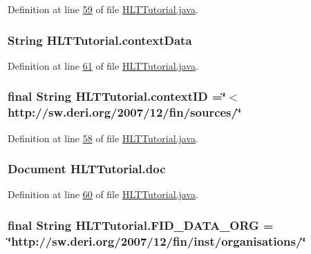 Definition at line \hyperlink{L59}{59} of file \hyperlink{}{H\-L\-T\-Tutorial.\-java}.

\hypertarget{class_h_l_t_tutorial_af324de58fa0893753bf1d449a959be55}{
\subsubsection[{context\-Data}]{\setlength{\rightskip}{0pt plus 5cm}String H\-L\-T\-Tutorial.\-context\-Data\hspace{0.3cm}{\ttfamily [static]}}}\label{class_h_l_t_tutorial_af324de58fa0893753bf1d449a959be55}


Definition at line \hyperlink{L61}{61} of file \hyperlink{}{H\-L\-T\-Tutorial.\-java}.

\hypertarget{class_h_l_t_tutorial_a8f7520df09b1deb0b52f1cd2341d14dd}{
\subsubsection[{context\-I\-D}]{\setlength{\rightskip}{0pt plus 5cm}final String H\-L\-T\-Tutorial.\-context\-I\-D =\char`\"{}$<$http\-://sw.\-deri.\-org/2007/12/fin/sources/\char`\"{}\hspace{0.3cm}{\ttfamily [static]}}}\label{class_h_l_t_tutorial_a8f7520df09b1deb0b52f1cd2341d14dd}


Definition at line \hyperlink{L58}{58} of file \hyperlink{}{H\-L\-T\-Tutorial.\-java}.

\hypertarget{class_h_l_t_tutorial_adc313cb5e485ec03e21897d5c0132591}{
\subsubsection[{doc}]{\setlength{\rightskip}{0pt plus 5cm}Document H\-L\-T\-Tutorial.\-doc}}\label{class_h_l_t_tutorial_adc313cb5e485ec03e21897d5c0132591}


Definition at line \hyperlink{L60}{60} of file \hyperlink{}{H\-L\-T\-Tutorial.\-java}.

\hypertarget{class_h_l_t_tutorial_aa4a2bd88329f2c78cd648c7242be3086}{
\subsubsection[{F\-I\-D\-\_\-\-D\-A\-T\-A\-\_\-\-O\-R\-G}]{\setlength{\rightskip}{0pt plus 5cm}final String H\-L\-T\-Tutorial.\-F\-I\-D\-\_\-\-D\-A\-T\-A\-\_\-\-O\-R\-G = \char`\"{}http\-://sw.\-deri.\-org/2007/12/fin/inst/organisations/\char`\"{}\hspace{0.3cm}{\ttfamily [static]}}}\label{class_h_l_t_tutorial_aa4a2bd88329f2c78cd648c7242be3086}


